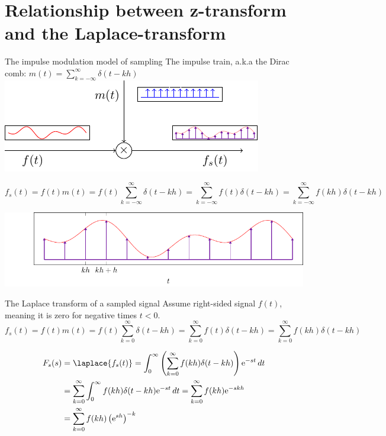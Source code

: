 \documentclass[presentation,aspectratio=169]{beamer}
\begin{document}
\section{Relationship between z-transform and the Laplace-transform}
\label{sec:org91fdf8e}
\begin{frame}[label={sec:org46ae157}]{The impulse modulation model of sampling}
The \alert{impulse train}, a.k.a the \alert{Dirac comb}:
\(m(t) = \sum_{k=-\infty}^{\infty} \delta(t-kh)\)\hspace*{10mm}
\pause
\includegraphics[width=0.4\linewidth]{../../figures/modulation-model-blocks}

\pause

\[f_s(t) = f(t)m(t) = f(t) \sum_{k=-\infty}^{\infty} \delta(t-kh) = \sum_{k=-\infty}^{\infty} f(t)\delta(t-kh) = \sum_{k=-\infty}^{\infty} f(kh) \delta(t-kh) \]


\begin{center}
\includegraphics[width=0.8\linewidth]{../../figures/modulation-model-timeseries}
\end{center}
\end{frame}

\begin{frame}[label={sec:org72df41e}]{The Laplace transform of a sampled signal}
Assume right-sided signal \(f(t)\), meaning it is zero for negative times \(t<0\).
\[f_s(t) = f(t)m(t) = f(t) \sum_{k=0}^{\infty} \delta(t-kh) = \sum_{k=0}^{\infty} f(t)\delta(t-kh) = \sum_{k=0}^{\infty} f(kh) \delta(t-kh) \]

\pause

\begin{align*}
F_s(s) &= \laplace{f_s(t)} = \int_0^\infty \left(\sum_{k=0}^{\infty} f(kh) \delta(t-kh)\right)\mathrm{e}^{-st}\, dt \\
&= \sum_{k=0}^{\infty} \int_0^\infty  f(kh) \delta(t-kh) \mathrm{e}^{-st}\, dt = \sum_{k=0}^{\infty} f(kh) \mathrm{e}^{-skh}\\
&= \sum_{k=0}^{\infty} f(kh) \left(\mathrm{e}^{sh}\right)^{-k}
\end{align*}
\end{frame}
\end{document}
